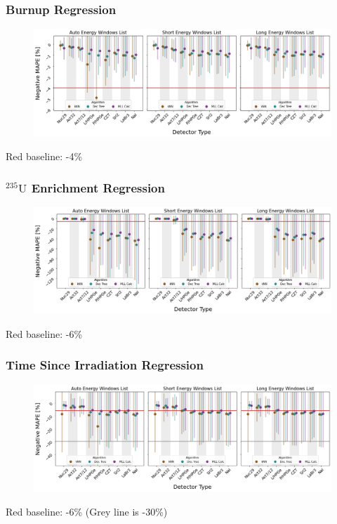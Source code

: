 \begin{frame}
  \frametitle{Burnup Regression}
  \begin{adjustwidth}{-15pt}{-10pt}
  \begin{figure}
    \centering
    \includegraphics[width=1.1\textwidth]{./figures/detector_preds_wrt_enlist_MAPE_burn.png}
  \end{figure}
  \vspace{12pt} \centering Red baseline: -4\% 
  \end{adjustwidth}
\end{frame}

\begin{frame}
  \frametitle{${}^{235}\text{U}$ Enrichment Regression}
  \begin{adjustwidth}{-15pt}{-10pt}
  \begin{figure}
    \centering
    \includegraphics[width=1.1\textwidth]{./figures/detector_preds_wrt_enlist_MAPE_enri.png}
  \end{figure}
  \vspace{12pt} \centering Red baseline: -6\% 
  \end{adjustwidth}
\end{frame}

\begin{frame}
  \frametitle{Time Since Irradiation Regression}
  \begin{adjustwidth}{-15pt}{-10pt}
  \begin{figure}
    \centering
    \includegraphics[width=1.1\textwidth]{./figures/detector_preds_wrt_enlist_MAPE_cool.png}
  \end{figure}
  \vspace{12pt} \centering Red baseline: -6\% (Grey line is -30\%) 
  \end{adjustwidth}
\end{frame}

